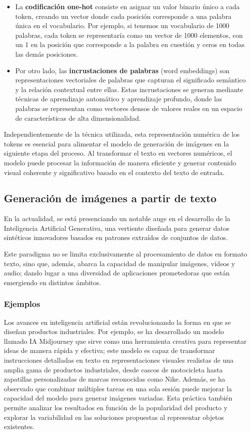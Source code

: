 \begin{itemize}
    \item La \textbf{codificación one-hot} consiste en asignar un valor binario único a cada token, creando un vector donde cada posición corresponde a una palabra única en el vocabulario. Por ejemplo, si tenemos un vocabulario de 1000 palabras, cada token se representaría como un vector de 1000 elementos, con un 1 en la posición que corresponde a la palabra en cuestión y ceros en todas las demás posiciones.
    \item Por otro lado, las \textbf{incrustaciones de palabras} (word embeddings) son representaciones vectoriales de palabras que capturan el significado semántico y la relación contextual entre ellas. Estas incrustaciones se generan mediante técnicas de aprendizaje automático y aprendizaje profundo, donde las palabras se representan como vectores densos de valores reales en un espacio de características de alta dimensionalidad.
\end{itemize}

Independientemente de la técnica utilizada, esta representación numérica de los tokens es esencial para alimentar el modelo de generación de imágenes en la siguiente etapa del proceso. Al transformar el texto en vectores numéricos, el modelo puede procesar la información de manera eficiente y generar contenido visual coherente y significativo basado en el contexto del texto de entrada.

\subsection{Generación de imágenes a partir de texto}
En la actualidad, se está presenciando un notable auge en el desarrollo de la Inteligencia Artificial Generativa, una vertiente diseñada para generar datos sintéticos innovadores basados en patrones extraídos de conjuntos de datos.

Este paradigma no se limita exclusivamente al procesamiento de datos en formato texto, sino que, además, abarca la capacidad de manipular imágenes, vídeos y audio; dando lugar a una diversidad de aplicaciones prometedoras que están emergiendo en distintos ámbitos.

\subsubsection{Ejemplos}
Los avances en inteligencia artificial están revolucionando la forma en que se diseñan productos industriales. Por ejemplo, se ha desarrollado un modelo llamado IA Midjourney que sirve como una herramienta creativa para representar ideas de manera rápida y efectiva; este modelo es capaz de transformar instrucciones detalladas en texto en representaciones visuales realistas de una amplia gama de productos industriales, desde cascos de motocicleta hasta zapatillas personalizadas de marcas reconocidas como Nike. Además, se ha observado que combinar múltiples tareas en una sola sesión puede mejorar la capacidad del modelo para generar imágenes variadas. Esta práctica también permite analizar los resultados en función de la popularidad del producto y explorar la variabilidad en las soluciones propuestas al representar objetos existentes.  \cite{calabuig2023modelos}

